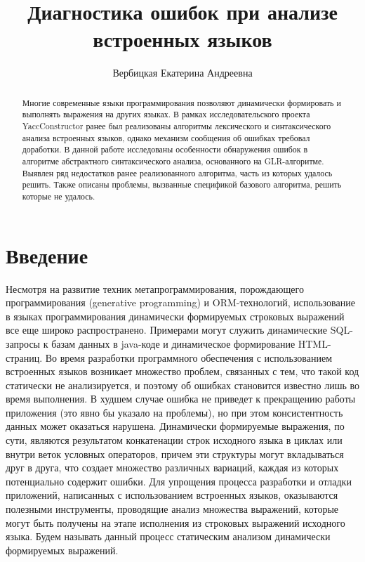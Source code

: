 
\title{Диагностика ошибок при анализе встроенных языков}
%

\author{Вербицкая Екатерина Андреевна}
%
%
%

\maketitle              %

\begin{abstract}
Многие современные языки программирования позволяют динамически формировать и выполнять 
выражения на других языках. В рамках исследовательского проекта YaccConstructor ранее был реализованы 
алгоритмы лексического и синтаксического анализа встроенных языков, однако механизм сообщения об ошибках 
требовал доработки. В данной работе исследованы особенности обнаружения ошибок в алгоритме абстрактного 
синтаксического анализа, основанного на GLR-алгоритме. Выявлен ряд недостатков ранее реализованного алгоритма, 
часть из которых удалось решить. Также описаны проблемы, вызванные спецификой базового алгоритма, 
решить которые не удалось.
\end{abstract}

\section*{Введение}
Несмотря на развитие техник метапрограммирования, порождающего программирования 
(generative programming) и ORM-технологий, использование в языках программирования 
динамически формируемых строковых выражений все еще широко распространено. 
Примерами могут служить динамические SQL-запросы к базам данных в java-коде и 
динамическое формирование HTML-страниц. Во время разработки программного обеспечения
с использованием встроенных языков возникает множество проблем, связанных с тем, 
что такой код статически не анализируется, и поэтому об ошибках становится 
известно лишь во время выполнения. В худшем случае ошибка не приведет к прекращению 
работы приложения (это явно бы указало на проблемы), но при этом консистентность 
данных может оказаться нарушена. Динамически формируемые выражения, по сути, являются 
результатом конкатенации строк исходного языка в циклах или внутри веток условных 
операторов, причем эти структуры могут вкладываться друг в друга, что создает 
множество различных вариаций, каждая из которых потенциально содержит ошибки. 
Для упрощения процесса разработки и отладки приложений, написанных с использованием 
встроенных языков, оказываются полезными инструменты, проводящие анализ множества 
выражений, которые могут быть получены на этапе исполнения из строковых выражений 
исходного языка. Будем называть данный процесс статическим анализом динамически 
формируемых выражений.


